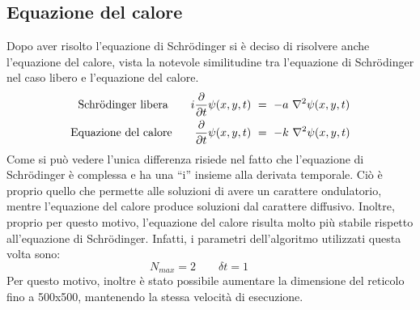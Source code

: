  \subsection{Equazione del calore}
 Dopo aver risolto l'equazione di Schr\"{o}dinger si è deciso di risolvere anche l'equazione del calore, vista la notevole similitudine tra l'equazione di Schr\"{o}dinger nel caso libero
 e l'equazione del calore.
 \begin{align}
  \mbox{Schr\"{o}dinger libera} \qquad i \p{}{t} \psi(x,y,t) \ & = \ - a \ \nabla^2 \psi (x,y,t) \\
  \mbox{Equazione del calore} \qquad \p{}{t} \psi(x,y,t) \ & = \ - k \ \nabla^2 \psi (x,y,t)
 \end{align}
Come si può vedere l'unica differenza risiede nel fatto che l'equazione di Schr\"{o}dinger è complessa e ha una ``i'' insieme alla derivata temporale.
Ciò è proprio quello che permette alle soluzioni di avere un carattere ondulatorio, mentre l'equazione del calore produce soluzioni dal carattere diffusivo.
Inoltre, proprio per questo motivo, l'equazione del calore risulta molto più stabile rispetto all'equazione di Schr\"{o}dinger. Infatti, i parametri dell'algoritmo utilizzati questa volta sono:
$$
 N_{max} = 2 \qquad \delta t = 1 \qquad  
$$
 Per questo motivo, inoltre è stato possibile aumentare la dimensione del reticolo fino a 500x500, mantenendo la stessa velocità di esecuzione.
